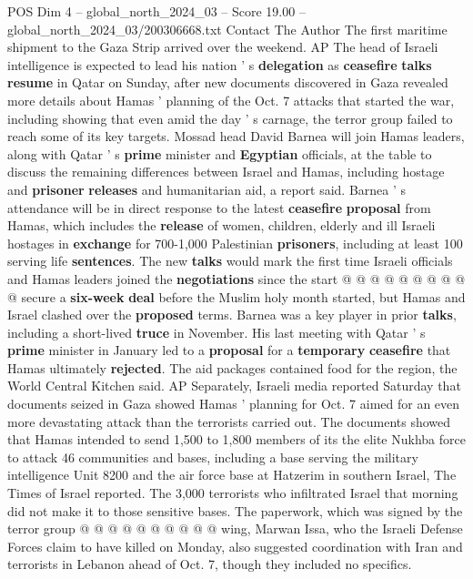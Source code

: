 \begin{textsample}{POS Dim 4 – global\_north\_2024\_03 – Score 19.00 – global\_north\_2024\_03/200306668.txt}  \label{ex:f4_pos_234}
Contact The Author The first maritime shipment to the Gaza Strip arrived over the weekend.
AP The head of Israeli intelligence is expected to lead his nation ' s \textbf{delegation} as \textbf{ceasefire} \textbf{talks} \textbf{resume} in Qatar on Sunday, after new documents discovered in Gaza revealed more details about Hamas ' planning of the Oct. 7 attacks that started the war, including showing that even amid the day ' s carnage, the terror group failed to reach some of its key targets.
Mossad head David Barnea will join Hamas leaders, along with Qatar ' s \textbf{prime} minister and \textbf{Egyptian} officials, at the table to discuss the remaining differences between Israel and Hamas, including hostage and \textbf{prisoner} \textbf{releases} and humanitarian aid, a report said.
Barnea ' s attendance will be in direct response to the latest \textbf{ceasefire} \textbf{proposal} from Hamas, which includes the \textbf{release} of women, children, elderly and ill Israeli hostages in \textbf{exchange} for 700-1,000 Palestinian \textbf{prisoners}, including at least 100 serving life \textbf{sentences}.
The new \textbf{talks} would mark the first time Israeli officials and Hamas leaders joined the \textbf{negotiations} since the start @ @ @ @ @ @ @ @ @ @ secure a \textbf{six-week} \textbf{deal} before the Muslim holy month started, but Hamas and Israel clashed over the \textbf{proposed} terms.
Barnea was a key player in prior \textbf{talks}, including a short-lived \textbf{truce} in November.
His last meeting with Qatar ' s \textbf{prime} minister in January led to a \textbf{proposal} for a \textbf{temporary} \textbf{ceasefire} that Hamas ultimately \textbf{rejected}.
The aid packages contained food for the region, the World Central Kitchen said.
AP Separately, Israeli media reported Saturday that documents seized in Gaza showed Hamas ' planning for Oct. 7 aimed for an even more devastating attack than the terrorists carried out.
The documents showed that Hamas intended to send 1,500 to 1,800 members of its the elite Nukhba force to attack 46 communities and bases, including a base serving the military intelligence Unit 8200 and the air force base at Hatzerim in southern Israel, The Times of Israel reported.
The 3,000 terrorists who infiltrated Israel that morning did not make it to those sensitive bases.
The paperwork, which was signed by the terror group @ @ @ @ @ @ @ @ @ @ wing, Marwan Issa, who the Israeli Defense Forces claim to have killed on Monday, also suggested coordination with Iran and terrorists in Lebanon ahead of Oct. 7, though they included no specifics.

\end{textsample}
